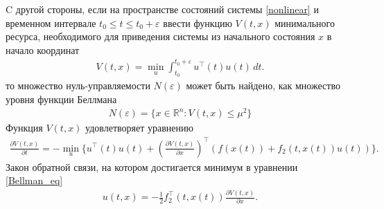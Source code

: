 C другой стороны, если на пространстве состояний системы \eqref{nonlinear} и временном интервале $ t_0 \leqslant t \leqslant t_0 + \varepsilon $ ввести функцию $ V(t,x) $ минимального ресурса, необходимого для приведения системы из начального состояния $x$ в начало координат
\begin{gather}\label{Bellman_fun}
	V(t,x) = \min\limits_{u} \int_{t_0}^{t_0+\varepsilon} u^{\top}(t) u(t) \, dt.
\end{gather}
то множество нуль-управляемости $ N(\varepsilon) $ может быть найдено, как множество уровня функции Беллмана
\begin{gather*}
	N(\varepsilon)  = \{x \in \mathbb{R}^n: V(t,x) \leqslant \mu^2\}
\end{gather*}
Функция $V(t,x)$  удовлетворяет уравнению
\begin{gather}\label{Bellman_eq}
	\frac{\partial V(t,x)}{\partial t} = -\min\limits_{u} \{u^{\top}(t) u(t) + \left(\frac{\partial V(t,x)}{\partial x}\right)^{\top} \left(f(x(t))+f_2(t,x(t))u(t)\right) \}.
\end{gather}
Закон обратной связи, на котором достигается минимум в уравнении \eqref{Bellman_eq}
\begin{gather}\label{feedback}
	u(t,x) = -\frac{1}{2} f_2^{\top}(t,x(t))\frac{\partial V(t,x)}{\partial x}.
\end{gather}



